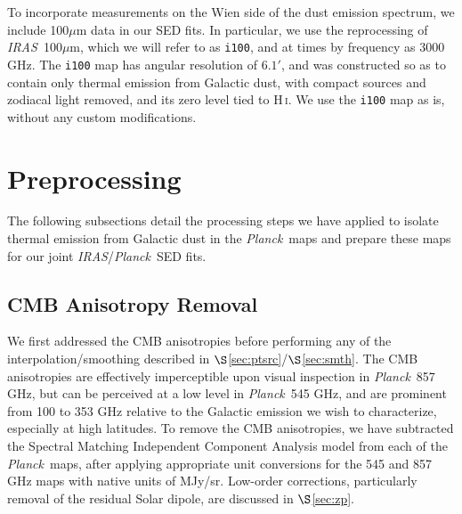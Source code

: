 \documentclass{emulateapj}
\newcommand{\IRAS}{{\it IRAS}}
\newcommand{\PLANCK}{{\it Planck}}
\begin{document}
To incorporate measurements on the Wien side of the dust emission spectrum, 
we include 100$\mu$m data in our SED fits. In particular, we use the 
\citet[henceforth SFD]{SFD} reprocessing of \IRAS~100$\mu$m, which we will 
refer to as \verb|i100|, and at times by frequency as 3000 GHz. The \verb|i100|
 map has angular resolution of $6.1'$, and was constructed so as to contain 
only thermal emission from Galactic dust, with compact sources and zodiacal 
light removed, and its zero level tied to H\,\textsc{i}. We use the \verb|i100|
map as is, without any custom modifications.

\section{Preprocessing}
\label{sec:prepro}

The following subsections detail the processing steps we have applied to 
isolate thermal emission from Galactic dust in the \PLANCK~maps and prepare
these maps for our joint \IRAS/\PLANCK~SED fits.

\subsection{CMB Anisotropy Removal}
\label{sec:cmb}
We first addressed the CMB anisotropies before performing any of the 
interpolation/smoothing described in $\S$\ref{sec:ptsrc}/$\S$\ref{sec:smth}. 
The CMB anisotropies are effectively imperceptible upon visual inspection 
in \PLANCK~857 GHz, but can be perceived at a low level in \PLANCK~545 GHz, and
are prominent from 100 to 353 GHz relative to the Galactic emission
we wish to characterize, especially at high latitudes. To remove the CMB 
anisotropies, we have subtracted the Spectral Matching Independent Component 
Analysis \citep[SMICA,][]{smica} model from each of the \PLANCK~maps, 
after applying appropriate unit conversions for the 545 and 857 GHz maps 
with native units of MJy/sr. Low-order corrections, particularly removal of the
residual Solar dipole, are discussed in $\S$\ref{sec:zp}.

\end{document}
